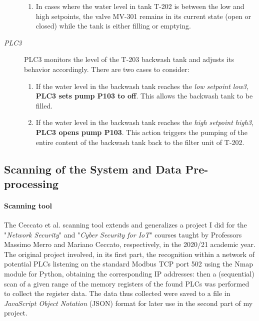 \begin{description}
\begin{enumerate}
		\item In cases where the water level in tank T-202 is between the low and high setpoints, the valve MV-301 remains in its current state (open or closed) while the tank is either filling or emptying.
	\end{enumerate}
	
	\item[\textit{PLC3}] PLC3 monitors the level of the T-203 backwash tank and adjusts its behavior accordingly. There are two cases to consider:
	
	\begin{enumerate}
		\item If the water level in the backwash tank reaches the \textit{low setpoint low3}, \textbf{PLC3 sets pump P103 to off}. This allows the backwash tank to be filled.
		
		\item If the water level in the backwash tank reaches the \textit{high setpoint high3}, \textbf{PLC3 opens pump P103}. This action triggers the pumping of the entire content of the backwash tank back to the filter unit of T-202.
	\end{enumerate}
\end{description} 


\subsection{Scanning of the System and Data Pre-processing}
\label{subsec:3_scan_preproc}
\paragraph{Scanning tool}
\label{par:3_scanning_tool}
The Ceccato et al. scanning tool extends and generalizes a project I did \cite{ns_proj} for the "\textit{Network Security}" and "\textit{Cyber Security for IoT}" courses taught by Professors Massimo Merro and Mariano Ceccato, respectively, in the 2020/21 academic year. The original project involved, in its first part, the recognition within a network of potential PLCs listening on the standard Modbus TCP port 502 using the Nmap module for Python, obtaining the corresponding IP addresses: then a (sequential) scan of a given range of the memory registers of the found PLCs was performed to collect the register data. The data thus collected were saved to a file in \textit{JavaScript Object Notation} (JSON) format for later use in the second part of my project.

